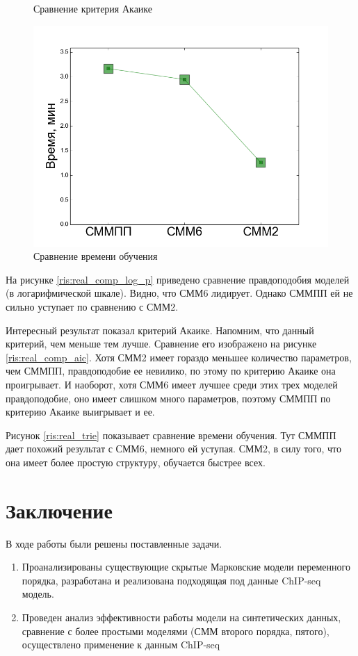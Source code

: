 \documentclass{matmex-diploma-custom}
\begin{document}
\begin{figure}[h!]
\begin{minipage}[b]{0.32 \textwidth}
	\centering
	\caption{ Сравнение критерия Акаике }
	\label{ris:real_comp_aic}
\end{minipage}
\hfill
\begin{minipage}[b]{0.32 \textwidth}
	\includegraphics[scale=0.28]{img/real/time.png}
	\centering
	\caption{ Сравнение времени обучения }
	\label{ris:real_comp_time}
\end{minipage}
\end{figure}

На рисунке \ref{ris:real_comp_log_p} приведено сравнение правдоподобия моделей (в логарифмической шкале). Видно, что СММ6 лидирует. Однако СММПП ей не сильно уступает по сравнению с СММ2.

Интересный результат показал критерий Акаике. Напомним, что данный критерий, чем меньше тем лучше. Сравнение его изображено на рисунке \ref{ris:real_comp_aic}.
Хотя СММ2 имеет гораздо меньшее количество параметров, чем СММПП, правдоподобие ее невилико, по этому по критерию Акаике она проигрывает. И наоборот, хотя СММ6 имеет лучшее среди этих трех моделей правдоподобие, оно имеет слишком много параметров, поэтому СММПП по критерию Акаике выигрывает и ее.

Рисунок \ref{ris:real_trie} показывает сравнение времени обучения. Тут СММПП дает похожий результат с СММ6, немного ей уступая. СММ2, в силу того, что она имеет более простую структуру, обучается быстрее всех.


\section*{Заключение}
В ходе работы были решены поставленные задачи.
\begin{enumerate}
\item
Проанализированы существующие скрытые Марковские
модели переменного порядка, разработана и
реализована подходящая под данные ChIP-seq модель.
\item
Проведен анализ эффективности работы модели на
синтетических данных, сравнение с более простыми
моделями (СММ второго порядка, пятого), осуществлено применение к
данным ChIP-seq
\end{enumerate}




\end{document}
